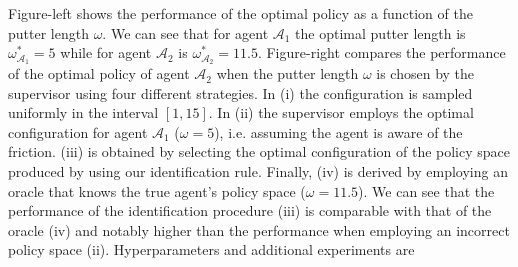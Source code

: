\documentclass[letterpaper]{article} %
\begin{document}
Figure-left shows the performance of the optimal policy as a function of the putter length $\omega$. We can see that for agent $\mathscr{A}_1$ the optimal putter length is $\omega^*_{\mathscr{A}_1}=5$ while for agent $\mathscr{A}_2$ is $\omega^*_{\mathscr{A}_2}=11.5$.
Figure-right compares the performance of the optimal policy of agent $\mathscr{A}_2$ when the putter length $\omega$ is chosen by the supervisor using four different strategies. In (i) the configuration is sampled uniformly in the interval $[1,15]$. In (ii) the supervisor employs the optimal configuration for agent $\mathscr{A}_1$ ($\omega=5$), i.e. assuming the agent is aware of the friction. (iii) is obtained by selecting the optimal configuration of the policy space produced by using our identification rule. Finally, (iv) is derived by employing an oracle that knows the true agent's policy space ($\omega=11.5$). We can see that the performance of the identification procedure (iii) is comparable with that of the oracle (iv) and notably higher than the performance when employing an incorrect policy space (ii). Hyperparameters and additional experiments are
\end{document}
